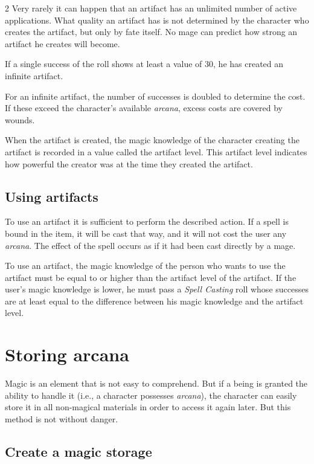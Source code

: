 \begin{multicols}{2}
Very rarely it can happen that an artifact has an unlimited number of active applications. What quality an artifact has is not determined by the character who creates the artifact, but only by fate itself. No mage can predict how strong an artifact he creates will become.

If a single success of the roll shows at least a value of 30, he has created an infinite artifact.

For an infinite artifact, the number of successes is doubled to determine the cost. If these exceed the character's available \textit{arcana}, excess costs are covered by wounds.

When the artifact is created, the magic knowledge of the character creating the artifact is recorded in a value called the artifact level. This artifact level indicates how powerful the creator was at the time they created the artifact.

\subsection{Using artifacts}

To use an artifact it is sufficient to perform the described action. If a spell is bound in the item, it will be cast that way, and it will not cost the user any \textit{arcana}. The effect of the spell occurs as if it had been cast directly by a mage.

To use an artifact, the magic knowledge of the person who wants to use the artifact must be equal to or higher than the artifact level of the artifact. If the user's magic knowledge is lower, he must pass a \textit{Spell Casting} roll whose successes are at least equal to the difference between his magic knowledge and the artifact level.

\section{Storing arcana}

Magic is an element that is not easy to comprehend. But if a being is granted the ability to handle it (i.e., a character possesses \textit{arcana}), the character can easily store it in all non-magical materials in order to access it again later. But this method is not without danger.

\subsection{Create a magic storage}


\end{multicols}
